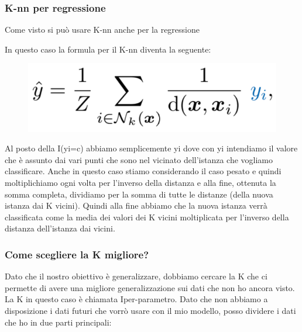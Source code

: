 \documentclass[14pt]{extreport}
\begin{document}
\subsubsection{K-nn per regressione}

Come visto si può usare K-nn anche per la regressione

In questo caso la formula per il K-nn diventa la seguente:


\begin{figure}[H]
	\centering
	\includegraphics[width=0.7\linewidth]{453.jpeg}
\end{figure}

Al posto della I(yi=c) abbiamo semplicemente yi dove con yi intendiamo il valore che è assunto dai vari punti che sono nel vicinato dell’istanza che
vogliamo classificare. Anche in questo caso stiamo considerando il caso pesato e quindi moltiplichiamo ogni volta per l’inverso della distanza e alla
fine, ottenuta la somma completa, dividiamo per la somma di tutte le distanze (della nuova istanza dai K vicini). Quindi alla fine abbiamo che la
nuova istanza verrà classificata come la media dei valori dei K vicini moltiplicata per l’inverso della distanza dell’istanza dai vicini.

\subsubsection{Come scegliere la K migliore?}

Dato che il nostro obiettivo è generalizzare, dobbiamo cercare la K che ci permette di avere una migliore generalizzazione sui dati che non ho ancora
visto. La K in questo caso è chiamata Iper-parametro. Dato che non abbiamo a disposizione i dati futuri che vorrò usare con il mio modello, posso
dividere i dati che ho in due parti principali:
\end{document}
